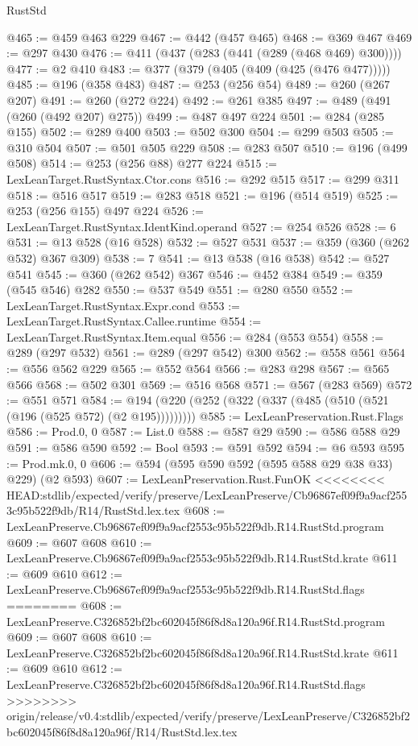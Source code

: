 \begin{lexlean}{RustStd}
\begin{coremodule}
{\begin{coremodule}
{{{{{{{{{{@465 := @459 @463 @229
@467 := @442 (@457 @465)
@468 := @369 @467
@469 := @297 @430
@476 := @411 (@437 (@283 (@441 (@289 (@468 @469) @300))))
@477 := @2 @410
@483 := @377 (@379 (@405 (@409 (@425 (@476 @477)))))
@485 := @196 (@358 @483)
@487 := @253 (@256 @54)
@489 := @260 (@267 @207)
@491 := @260 (@272 @224)
@492 := @261 @385
@497 := @489 (@491 (@260 (@492 @207) @275))
@499 := @487 @497 @224
@501 := @284 (@285 @155)
@502 := @289 @400
@503 := @502 @300
@504 := @299 @503
@505 := @310 @504
@507 := @501 @505 @229
@508 := @283 @507
@510 := @196 (@499 @508)
@514 := @253 (@256 @88) @277 @224
@515 := LexLeanTarget.RustSyntax.Ctor.cons
@516 := @292 @515
@517 := @299 @311
@518 := @516 @517
@519 := @283 @518
@521 := @196 (@514 @519)
@525 := @253 (@256 @155) @497 @224
@526 := LexLeanTarget.RustSyntax.IdentKind.operand
@527 := @254 @526
@528 := 6
@531 := @13 @528 (@16 @528)
@532 := @527 @531
@537 := @359 (@360 (@262 @532) @367 @309)
@538 := 7
@541 := @13 @538 (@16 @538)
@542 := @527 @541
@545 := @360 (@262 @542) @367
@546 := @452 @384
@549 := @359 (@545 @546) @282
@550 := @537 @549
@551 := @280 @550
@552 := LexLeanTarget.RustSyntax.Expr.cond
@553 := LexLeanTarget.RustSyntax.Callee.runtime
@554 := LexLeanTarget.RustSyntax.Item.equal
@556 := @284 (@553 @554)
@558 := @289 (@297 @532)
@561 := @289 (@297 @542) @300
@562 := @558 @561
@564 := @556 @562 @229
@565 := @552 @564
@566 := @283 @298
@567 := @565 @566
@568 := @502 @301
@569 := @516 @568
@571 := @567 (@283 @569)
@572 := @551 @571
@584 := @194 (@220 (@252 (@322 (@337 (@485 (@510 (@521 (@196 (@525 @572) (@2 @195)))))))))
@585 := LexLeanPreservation.Rust.Flags
@586 := Prod.{0, 0}
@587 := List.{0}
@588 := @587 @29
@590 := @586 @588 @29
@591 := @586 @590
@592 := Bool
@593 := @591 @592
@594 := @6 @593
@595 := Prod.mk.{0, 0}
@606 := @594 (@595 @590 @592 (@595 @588 @29 @38 @33) @229) (@2 @593)
@607 := LexLeanPreservation.Rust.FunOK
<<<<<<<< HEAD:stdlib/expected/verify/preserve/LexLeanPreserve/Cb96867ef09f9a9acf2553c95b522f9db/R14/RustStd.lex.tex
@608 := LexLeanPreserve.Cb96867ef09f9a9acf2553c95b522f9db.R14.RustStd.program
@609 := @607 @608
@610 := LexLeanPreserve.Cb96867ef09f9a9acf2553c95b522f9db.R14.RustStd.krate
@611 := @609 @610
@612 := LexLeanPreserve.Cb96867ef09f9a9acf2553c95b522f9db.R14.RustStd.flags
========
@608 := LexLeanPreserve.C326852bf2bc602045f86f8d8a120a96f.R14.RustStd.program
@609 := @607 @608
@610 := LexLeanPreserve.C326852bf2bc602045f86f8d8a120a96f.R14.RustStd.krate
@611 := @609 @610
@612 := LexLeanPreserve.C326852bf2bc602045f86f8d8a120a96f.R14.RustStd.flags
>>>>>>>> origin/release/v0.4:stdlib/expected/verify/preserve/LexLeanPreserve/C326852bf2bc602045f86f8d8a120a96f/R14/RustStd.lex.tex
}}}}}}}}}}
\end{coremodule}}
\end{coremodule}
\end{lexlean}
